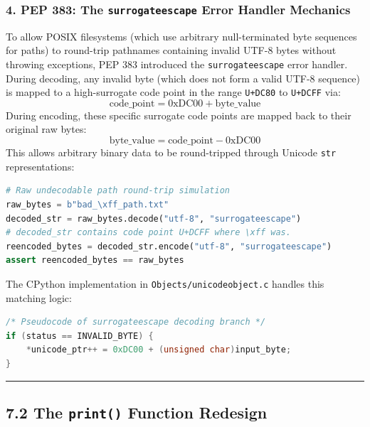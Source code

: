 \hypertarget{pep-383-the-surrogateescape-error-handler-mechanics}{%
\subsubsection{\texorpdfstring{4. PEP 383: The \texttt{surrogateescape}
Error Handler
Mechanics}{4. PEP 383: The surrogateescape Error Handler Mechanics}}\label{pep-383-the-surrogateescape-error-handler-mechanics}}

To allow POSIX filesystems (which use arbitrary null-terminated byte
sequences for paths) to round-trip pathnames containing invalid UTF-8
bytes without throwing exceptions, PEP 383 introduced the
\passthrough{\lstinline!surrogateescape!} error handler. During
decoding, any invalid byte (which does not form a valid UTF-8 sequence)
is mapped to a high-surrogate code point in the range
\passthrough{\lstinline!U+DC80!} to \passthrough{\lstinline!U+DCFF!}
via: \[\text{code\_point} = 0\text{xDC00} + \text{byte\_value}\] During
encoding, these specific surrogate code points are mapped back to their
original raw bytes:
\[\text{byte\_value} = \text{code\_point} - 0\text{xDC00}\] This allows
arbitrary binary data to be round-tripped through Unicode
\passthrough{\lstinline!str!} representations:

\begin{lstlisting}[language=Python]
# Raw undecodable path round-trip simulation
raw_bytes = b"bad_\xff_path.txt"
decoded_str = raw_bytes.decode("utf-8", "surrogateescape")
# decoded_str contains code point U+DCFF where \xff was.
reencoded_bytes = decoded_str.encode("utf-8", "surrogateescape")
assert reencoded_bytes == raw_bytes
\end{lstlisting}

The CPython implementation in
\passthrough{\lstinline!Objects/unicodeobject.c!} handles this matching
logic:

\begin{lstlisting}[language=C]
/* Pseudocode of surrogateescape decoding branch */
if (status == INVALID_BYTE) {
    *unicode_ptr++ = 0xDC00 + (unsigned char)input_byte;
}
\end{lstlisting}

\begin{center}\rule{0.5\linewidth}{0.5pt}\end{center}

\hypertarget{the-print-function-redesign}{%
\subsection{\texorpdfstring{7.2 The \texttt{print()} Function
Redesign}{7.2 The print() Function Redesign}}\label{the-print-function-redesign}}

